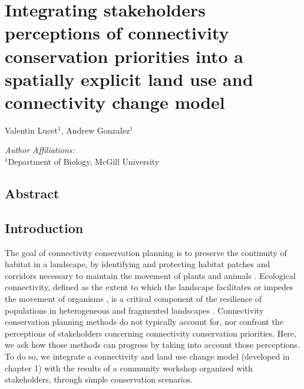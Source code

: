 \chapter{Integrating stakeholders perceptions of connectivity conservation priorities into a spatially explicit land use and connectivity change model}
\begin{center}
{Valentin Lucet$^{1}$, Andrew Gonzalez$^{1}$}\\
\end{center}
\textit{Author Affiliations:}\\
\normalsize{$^{1}$Department of Biology, McGill University}\\

\section{Abstract}

\newpage

\section{Introduction}
%


The goal of connectivity conservation planning is to preserve the continuity of habitat in a landscape, by identifying and protecting habitat patches and corridors necessary to maintain the movement of plants and animals \citep{keeley_thirty_2019}. Ecological connectivity, defined as the extent to which the landscape facilitates or impedes the movement of organisms \citep{crooks_landscape_2006}, is a critical component of the resilience of populations in heterogeneous and fragmented landscapes \citep{gonzalez_spatial_2017}. Connectivity conservation planning methods do not typically account for, nor confront the perceptions of stakeholders concerning connectivity conservation priorities. Here, we ask how those methods can progress by taking into account those perceptions. To do so, we integrate a connectivity and land use change model (developed in chapter 1) with the results of a community workshop organized with stakeholders, through simple conservation scenarios.

